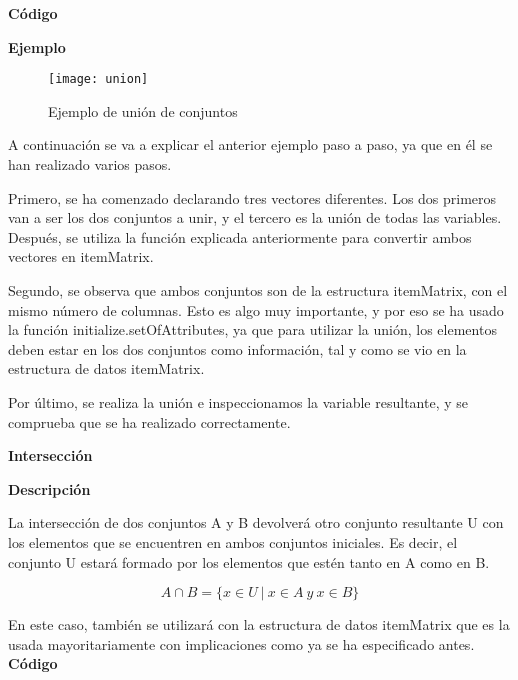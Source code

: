     \textbf{C\'odigo}

    
    \clearpage

    \textbf{Ejemplo}

    \begin{figure}[H]
        \centering
        \texttt{[image: union]}
        \caption{Ejemplo de uni\'on de conjuntos}
        \label{fig:union}
    \end{figure}

    A continuaci\'on se va a explicar el anterior ejemplo paso a paso, ya que en \'el se han realizado varios pasos.

    Primero, se ha comenzado declarando tres vectores diferentes. Los dos primeros van a ser los dos conjuntos a unir, y el 
    tercero es la uni\'on de todas las variables. Despu\'es, se utiliza la funci\'on explicada anteriormente para convertir ambos 
    vectores en itemMatrix.

    Segundo, se observa que ambos conjuntos son de la estructura itemMatrix, con el mismo n\'umero de columnas. Esto es algo muy 
    importante, y por eso se ha usado la funci\'on initialize.setOfAttributes, ya que para utilizar la uni\'on, los elementos deben 
    estar en los dos conjuntos como informaci\'on, tal y como se vio en la estructura de datos itemMatrix.

    Por \'ultimo, se realiza la uni\'on e inspeccionamos la variable resultante, y se comprueba que se ha realizado correctamente.
    \\

    \bigskip

\textbf{ \large Intersecci\'on}

\smallskip

    \textbf{Descripci\'on}
    
    La intersecci\'on de dos conjuntos A y B devolver\'a otro conjunto resultante U con los elementos 
    que se encuentren en ambos conjuntos iniciales. Es decir, el conjunto U estar\'a formado por los elementos 
    que est\'en tanto en A como en B.

    \[
        A \cap B = \{x\in U ~ | ~ x\in A ~ y ~ x\in B \}
    \]

    En este caso, tambi\'en se utilizar\'a con la estructura de datos itemMatrix que es la usada mayoritariamente con implicaciones 
    como ya se ha especificado antes.
    \\


    \textbf{C\'odigo}

